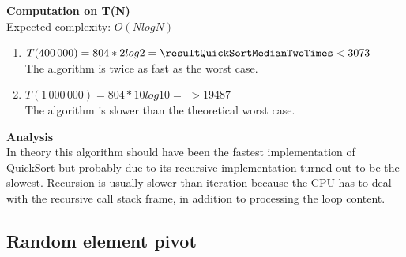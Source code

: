 \documentclass{article}
\begin{document}
\textbf{Computation on T(N)}\\

Expected complexity: $O(NlogN)$\\


\begin{enumerate}
    \item $T(400\,000) = 804 *2 log 2 = \resultQuickSortMedianTwoTimes < 3073$\\
    The algorithm is twice as fast as the worst case.
    
    \item $T(1\,000\,000) = 804 *10 log 10 =$
    $> 19487$\\
    The algorithm is slower than the theoretical worst case.
    
\end{enumerate}

\textbf{Analysis}\\

In theory this algorithm should have been the fastest implementation of QuickSort but probably due to its recursive implementation turned out to be the slowest. Recursion is usually slower than iteration because the CPU has to deal with the recursive call stack frame, in addition to processing the loop content.

\newpage
\subsection{Random element pivot}

\begin{center}
\end{center}
\end{document}
